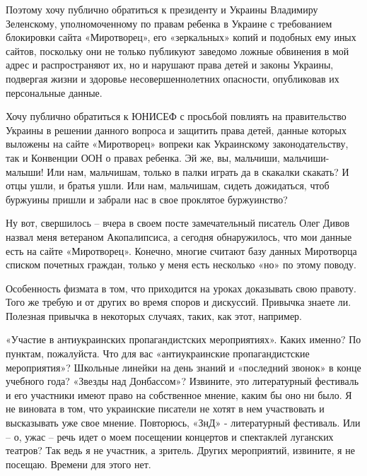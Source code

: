 Поэтому хочу публично обратиться к президенту и Украины Владимиру Зеленскому,
уполномоченному по правам ребенка в Украине с требованием блокировки сайта
«Миротворец», его «зеркальных» копий и подобных ему иных сайтов, поскольку они
не только публикуют заведомо ложные обвинения в мой адрес и распространяют их,
но и нарушают права детей и законы Украины, подвергая жизни и здоровье
несовершеннолетних опасности, опубликовав их персональные данные.

Хочу публично обратиться к ЮНИСЕФ с просьбой повлиять на правительство Украины
в решении данного вопроса и защитить права детей, данные которых выложены на
сайте «Миротворец» вопреки как Украинскому законодательству, так и Конвенции
ООН о правах ребенка. Эй же, вы, мальчиши, мальчиши-малыши! Или нам, мальчишам,
только в палки играть да в скакалки скакать? И отцы ушли, и братья ушли. Или
нам, мальчишам, сидеть дожидаться, чтоб буржуины пришли и забрали нас в свое
проклятое буржуинство?

Ну вот, свершилось – вчера в своем посте замечательный писатель Олег Дивов
назвал меня ветераном Акопалипсиса, а сегодня обнаружилось, что мои данные есть
на сайте «Миротворец». Конечно, многие считают базу данных Миротворца списком
почетных граждан, только у меня есть несколько «но» по этому поводу.

Особенность физмата в том, что приходится на уроках доказывать свою правоту.
Того же требую и от других во время споров и дискуссий. Привычка знаете ли.
Полезная привычка в некоторых случаях, таких, как этот, например.

«Участие в антиукраинских пропагандистских мероприятиях». Каких именно? По
пунктам, пожалуйста. Что для вас «антиукраинские пропагандистские мероприятия»?
Школьные линейки на день знаний и «последний звонок» в конце учебного года?
«Звезды над Донбассом»? Извините, это литературный фестиваль и его участники
имеют право на собственное мнение, каким бы оно ни было. Я не виновата в том,
что украинские писатели не хотят в нем участвовать и высказывать уже свое
мнение. Повторюсь, «ЗнД» - литературный фестиваль. Или – о, ужас – речь идет о
моем посещении концертов и спектаклей луганских театров? Так ведь я не
участник, а зритель. Других мероприятий, извините, я не посещаю. Времени для
этого нет.

